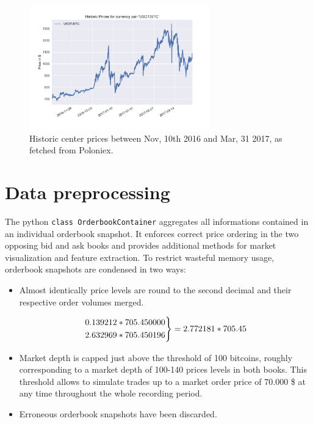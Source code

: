 \begin{figure}[ht]
	\centering
   \includegraphics[width=0.7\textwidth]{content/drawings/bitcoin_historicPrices}
	\caption{Historic center prices between Nov, 10th 2016 and Mar, 31 2017, as fetched from Poloniex.}
	\label{fig:ploniexPriceHistory}
\end{figure}

\section{Data preprocessing}
\label{chap:preprocessing}
The python \lstinline!class OrderbookContainer! aggregates all informations contained in an individual orderbook snapshot. It enforces correct price ordering in the two opposing bid and ask books and provides additional methods for market visualization and feature extraction. To restrict wasteful memory usage, orderbook snapshots are condensed in two ways:

\begin{itemize}
\item Almost identically price levels are round to the second decimal and their respective order volumes merged.

 \[ 
  \begin{rcases}
    0.139212 * 705.450000\\
    2.632969 * 705.450196\\
  \end{rcases} 
  = 2.772181 * 705.45
\]
\item Market depth is capped just above the threshold of 100 bitcoins, roughly corresponding to a market depth of 100-140 prices levels in both books. This threshold allows to simulate trades up to a market order price of 70.000 \$ at any time throughout the whole recording period.

\item Erroneous orderbook snapshots have been discarded.

\end{itemize}

